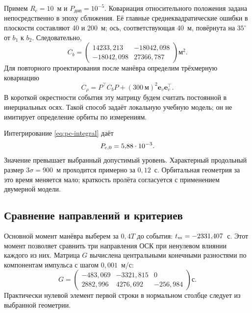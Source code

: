 \documentclass[a4paper,11pt]{article}
\newcommand{\vect}[1]{\boldsymbol{#1}}
\numberwithin{equation}{section}
\begin{document}
Примем $R_c=10$~м и $P_{\text{доп}}=10^{-5}$.
Ковариация относительного положения задана непосредственно
в эпоху сближения. Её главные среднеквадратические ошибки
в плоскости составляют 40 и 200~м; ось, соответствующая
40~м, повёрнута на $35^\circ$ от $b_1$ к $b_2$.
Следовательно,
\begin{equation}
 C_b=\begin{pmatrix}
 14233{,}213&-18042{,}098\\
 -18042{,}098&27366{,}787
 \end{pmatrix}\text{м}^2.
 \label{eq:example-covariance}
\end{equation}
Для повторного проектирования после манёвра определим
трёхмерную ковариацию
\begin{equation}
 C_{\rho}=P^\top C_bP+(300~\text{м})^2\vect e_v\vect e_v^\top.
 \label{eq:example-covariance-3d}
\end{equation}
В короткой окрестности события эту матрицу будем считать
постоянной в инерциальных осях. Такой способ задаёт локальную
учебную модель; он не имитирует определение орбиты по измерениям.

Интегрирование \eqref{eq:pc-integral} даёт
\begin{equation}
 P_{c,0}=5{,}88\cdot10^{-3}.
 \label{eq:example-initial-pc}
\end{equation}
Значение превышает выбранный допустимый уровень.
Характерный продольный размер $3\sigma=900$~м
проходится примерно за $0{,}12$~с. Орбитальная геометрия
за это время меняется мало; краткость пролёта согласуется
с применением двумерной модели.

\subsection{Сравнение направлений и критериев}

Основной момент манёвра выберем за $0{,}4T$ до события:
$t_m=-2331{,}407$~с. Этот момент позволяет сравнить
три направления ОСК при ненулевом влиянии каждого из них.
Матрица $G$ вычислена центральными конечными разностями
по компонентам импульса с шагом $0{,}001$~м/с:
\begin{equation}
 G=\begin{pmatrix}
 -483{,}069&-3321{,}815&0\\
 2882{,}996&4276{,}692&-256{,}984
 \end{pmatrix}\text{с}.
 \label{eq:example-G}
\end{equation}
Практически нулевой элемент первой строки в нормальном
столбце следует из выбранной геометрии.
\end{document}
